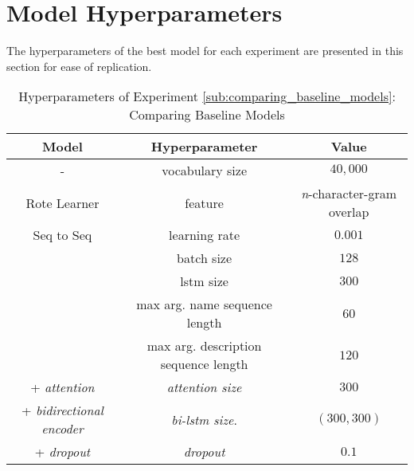 \chapter{Model Hyperparameters}
\label{Model Hyperparameters}

The hyperparameters of the best model for each experiment are presented in this section for ease of replication.


\begin{table}[h!]
\begin{center}
\begin{tabular}{ c | c | c  }
    \textbf{Model}                           {}  & \textbf{Hyperparameter}  & \textbf{Value}    \\
    \hline
    -                                 & vocabulary size            & $40,000$ \\
    \hline
    Rote Learner                      & feature                    & \textit{n}-character-gram overlap \\
    \hline
    Seq to Seq                        & learning rate              & $0.001$         \\
                                      & batch size                 & $128$           \\
                                      & lstm size                  & $300$           \\
                                      & max arg. name sequence length         & $60$   \\
                                      & max arg. description sequence length  & $120$  \\
    + \textit{attention}              & \textit{attention size}    & $300$           \\
    + \textit{bidirectional encoder}  & \textit{bi-lstm size}.     & $(300,300) $    \\
    + \textit{dropout}                & \textit{dropout}           & $0.1$           \\
    \hline
\end{tabular}
\caption {Hyperparameters of Experiment \ref{sub:comparing_baseline_models}: Comparing Baseline Models }
\label{table:hyperparams_name_baseline}
\end{center}
\end{table}


